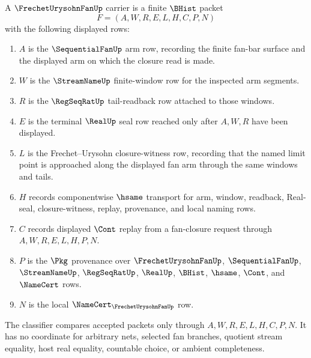 \begin{definition}
\label{def:frechet-urysohn-fan-carrier}
A $\FrechetUrysohnFanUp$ carrier is a finite $\BHist$ packet
$$
F=(A,W,R,E,L,H,C,P,N)
$$
with the following displayed rows:
\begin{enumerate}
\item $A$ is the $\SequentialFanUp$ arm row, recording the finite fan-bar surface and the displayed arm on which the closure read is made.
\item $W$ is the $\StreamNameUp$ finite-window row for the inspected arm segments.
\item $R$ is the $\RegSeqRatUp$ tail-readback row attached to those windows.
\item $E$ is the terminal $\RealUp$ seal row reached only after $A,W,R$ have been displayed.
\item $L$ is the Frechet--Urysohn closure-witness row, recording that the named limit point is approached along the displayed fan arm through the same windows and tails.
\item $H$ records componentwise $\hsame$ transport for arm, window, readback, Real-seal, closure-witness, replay, provenance, and local naming rows.
\item $C$ records displayed $\Cont$ replay from a fan-closure request through $A,W,R,E,L,H,P,N$.
\item $P$ is the $\Pkg$ provenance over $\FrechetUrysohnFanUp$, $\SequentialFanUp$, $\StreamNameUp$, $\RegSeqRatUp$, $\RealUp$, $\BHist$, $\hsame$, $\Cont$, and $\NameCert$ rows.
\item $N$ is the local $\NameCert_{\FrechetUrysohnFanUp}$ row.
\end{enumerate}
The classifier compares accepted packets only through $A,W,R,E,L,H,C,P,N$. It has no coordinate for arbitrary nets, selected fan branches, quotient stream equality, host real equality, countable choice, or ambient completeness.
\end{definition}

